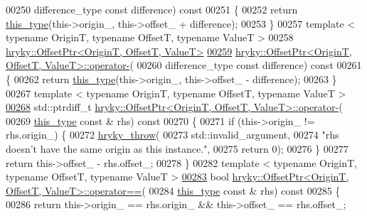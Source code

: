 \begin{DoxyCode}
00250     difference\_type \textcolor{keyword}{const} difference)\textcolor{keyword}{ const}
00251 \textcolor{keyword}{}\{
00252     \textcolor{keywordflow}{return} \hyperlink{classhryky_1_1_offset_ptr}{this_type}(this->origin\_, this->offset\_ + difference);
00253 \}
00257 \textcolor{keyword}{template} < \textcolor{keyword}{typename} OriginT, \textcolor{keyword}{typename} OffsetT, \textcolor{keyword}{typename} ValueT >
00258 \hyperlink{classhryky_1_1_offset_ptr}{hryky::OffsetPtr<OriginT, OffsetT, ValueT>} 
\hypertarget{offset__ptr_8h_source_l00259}{}\hyperlink{classhryky_1_1_offset_ptr_a6c158180159c88dac9495ff9ebfca368}{00259} \hyperlink{classhryky_1_1_offset_ptr}{hryky::OffsetPtr<OriginT, OffsetT, ValueT>::operator-}(
00260     difference\_type \textcolor{keyword}{const} difference)\textcolor{keyword}{ const}
00261 \textcolor{keyword}{}\{
00262     \textcolor{keywordflow}{return} \hyperlink{classhryky_1_1_offset_ptr}{this_type}(this->origin\_, this->offset\_ - difference);
00263 \}
00267 \textcolor{keyword}{template} < \textcolor{keyword}{typename} OriginT, \textcolor{keyword}{typename} OffsetT, \textcolor{keyword}{typename} ValueT >
\hypertarget{offset__ptr_8h_source_l00268}{}\hyperlink{classhryky_1_1_offset_ptr_a61e9d4ecdbb0377dffefb557515f0088}{00268} std::ptrdiff\_t \hyperlink{classhryky_1_1_offset_ptr}{hryky::OffsetPtr<OriginT, OffsetT, ValueT>::operator-}(
00269     \hyperlink{classhryky_1_1_offset_ptr}{this_type} \textcolor{keyword}{const} & rhs)\textcolor{keyword}{ const}
00270 \textcolor{keyword}{}\{
00271     \textcolor{keywordflow}{if} (this->origin\_ != rhs.origin\_) \{
00272         \hyperlink{debug__common_8h_af50606eac4009921527ddcaed392b2c2}{hryky_throw}(
00273             std::invalid\_argument,
00274             \textcolor{stringliteral}{"rhs doesn't have the same origin as this instance."},
00275             \textcolor{keywordflow}{return} 0);
00276     \}
00277     \textcolor{keywordflow}{return} this->offset\_ - rhs.offset\_;
00278 \}
00282 \textcolor{keyword}{template} < \textcolor{keyword}{typename} OriginT, \textcolor{keyword}{typename} OffsetT, \textcolor{keyword}{typename} ValueT >
\hypertarget{offset__ptr_8h_source_l00283}{}\hyperlink{classhryky_1_1_offset_ptr_afe85c6946cc887fa404739699aa249c6}{00283} \textcolor{keywordtype}{bool} \hyperlink{namespacehryky_a96bfe0df0a09db56e7253330de4f2243}{hryky::OffsetPtr<OriginT, OffsetT, ValueT>::operator==}(
00284     \hyperlink{classhryky_1_1_offset_ptr}{this_type} \textcolor{keyword}{const} & rhs)\textcolor{keyword}{ const}
00285 \textcolor{keyword}{}\{
00286     \textcolor{keywordflow}{return} this->origin\_ == rhs.origin\_ && this->offset\_ == rhs.offset\_;

\end{DoxyCode}
